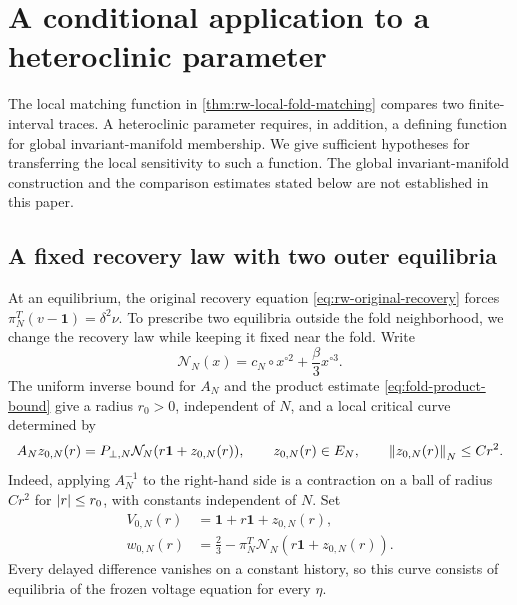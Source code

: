 \section{A conditional application to a heteroclinic parameter}
\label{sec:heteroclinic-connection}

The local matching function in \cref{thm:rw-local-fold-matching} compares
two finite-interval traces.  A heteroclinic parameter requires, in addition,
a defining function for global invariant-manifold membership.  We give
sufficient hypotheses for transferring the local sensitivity to such a
function.  The global invariant-manifold construction and the comparison
estimates stated below are not established in this paper.

\subsection{A fixed recovery law with two outer equilibria}
\label{subsec:global-modification}

At an equilibrium, the original recovery equation
\eqref{eq:rw-original-recovery} forces
\(\pi_N^T(v-\mathbf1)=\delta^2\nu\).  To prescribe two equilibria outside
the fold neighborhood, we change the recovery law while keeping it fixed
near the fold.  Write
\[
 \mathcal N_N(x)=c_N\circ x^{\circ2}+\frac\beta3x^{\circ3}.
\]
The uniform inverse bound for \(A_N\) and the product estimate
\eqref{eq:fold-product-bound} give a radius \(r_0>0\), independent of
\(N\), and a local critical curve determined by
\begin{equation}
 A_Nz_{0,N}(r)=P_{\perp,N}\mathcal N_N
       (r\mathbf1+z_{0,N}(r)),
 \qquad z_{0,N}(r)\in E_N,
 \qquad \left\lVert z_{0,N}(r)\right\rVert_N\le Cr^2.
 \label{eq:rw-critical-curve-equation}
\end{equation}
Indeed, applying \(A_N^{-1}\) to the right-hand side is a contraction on a
ball of radius \(Cr^2\) for \(\left\lvert r\right\rvert\le r_0\), with constants independent
of \(N\).  Set
\begin{equation}
 \begin{aligned}
 V_{0,N}(r)&=\mathbf1+r\mathbf1+z_{0,N}(r),\\
 w_{0,N}(r)&=\frac23-\pi_N^T\mathcal N_N
                       (r\mathbf1+z_{0,N}(r)).
 \end{aligned}
 \label{eq:rw-critical-curve}
\end{equation}
Every delayed difference vanishes on a constant history, so this curve
consists of equilibria of the frozen voltage equation for every \(\eta\).

